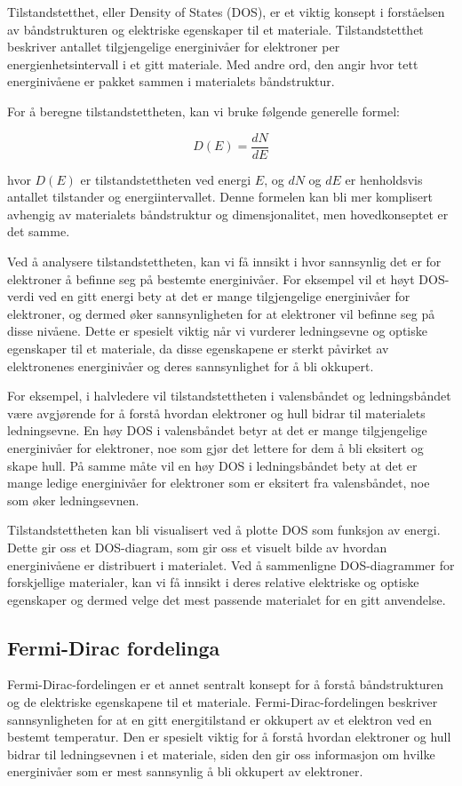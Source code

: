 Tilstandstetthet, eller Density of States (DOS), er et viktig konsept i forståelsen av båndstrukturen og elektriske egenskaper til et materiale. Tilstandstetthet beskriver antallet tilgjengelige energinivåer for elektroner per energienhetsintervall i et gitt materiale. Med andre ord, den angir hvor tett energinivåene er pakket sammen i materialets båndstruktur.

For å beregne tilstandstettheten, kan vi bruke følgende generelle formel:

\begin{equation*}
D(E) = \frac{dN}{dE}
\end{equation*}

hvor $D(E)$ er tilstandstettheten ved energi $E$, og $dN$ og $dE$ er henholdsvis antallet tilstander og energiintervallet. Denne formelen kan bli mer komplisert avhengig av materialets båndstruktur og dimensjonalitet, men hovedkonseptet er det samme.

Ved å analysere tilstandstettheten, kan vi få innsikt i hvor sannsynlig det er for elektroner å befinne seg på bestemte energinivåer. For eksempel vil et høyt DOS-verdi ved en gitt energi bety at det er mange tilgjengelige energinivåer for elektroner, og dermed øker sannsynligheten for at elektroner vil befinne seg på disse nivåene. Dette er spesielt viktig når vi vurderer ledningsevne og optiske egenskaper til et materiale, da disse egenskapene er sterkt påvirket av elektronenes energinivåer og deres sannsynlighet for å bli okkupert.

For eksempel, i halvledere vil tilstandstettheten i valensbåndet og ledningsbåndet være avgjørende for å forstå hvordan elektroner og hull bidrar til materialets ledningsevne. En høy DOS i valensbåndet betyr at det er mange tilgjengelige energinivåer for elektroner, noe som gjør det lettere for dem å bli eksitert og skape hull. På samme måte vil en høy DOS i ledningsbåndet bety at det er mange ledige energinivåer for elektroner som er eksitert fra valensbåndet, noe som øker ledningsevnen.

Tilstandstettheten kan bli visualisert ved å plotte DOS som funksjon av energi. Dette gir oss et DOS-diagram, som gir oss et visuelt bilde av hvordan energinivåene er distribuert i materialet. Ved å sammenligne DOS-diagrammer for forskjellige materialer, kan vi få innsikt i deres relative elektriske og optiske egenskaper og dermed velge det mest passende materialet for en gitt anvendelse.

\subsection*{Fermi-Dirac fordelinga}
Fermi-Dirac-fordelingen er et annet sentralt konsept for å forstå båndstrukturen og de elektriske egenskapene til et materiale. Fermi-Dirac-fordelingen beskriver sannsynligheten for at en gitt energitilstand er okkupert av et elektron ved en bestemt temperatur. Den er spesielt viktig for å forstå hvordan elektroner og hull bidrar til ledningsevnen i et materiale, siden den gir oss informasjon om hvilke energinivåer som er mest sannsynlig å bli okkupert av elektroner.

